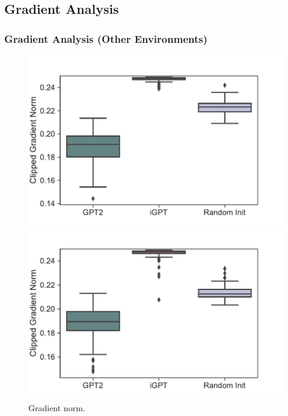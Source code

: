 \documentclass{article}
\begin{document}
\subsection{Gradient Analysis}
\label{appendix:results-for-other-conditions-gradient-analysis}

\subsubsection{Gradient Analysis (Other Environments)}
\begin{figure}[H]
    \centering
    \begin{minipage}[b]{0.48\linewidth}
        \includegraphics[width=\linewidth]{figs/gradnorms_1_gpt2_igpt_dt_halfcheetah_medium_666.pdf}
    \end{minipage}
    \begin{minipage}[b]{0.48\linewidth}
        \includegraphics[width=\linewidth]{figs/gradnorms_1_gpt2_igpt_dt_walker2d_medium_666.pdf}
    \end{minipage}
    \caption{Gradient norm.}
\end{figure}
\end{document}
